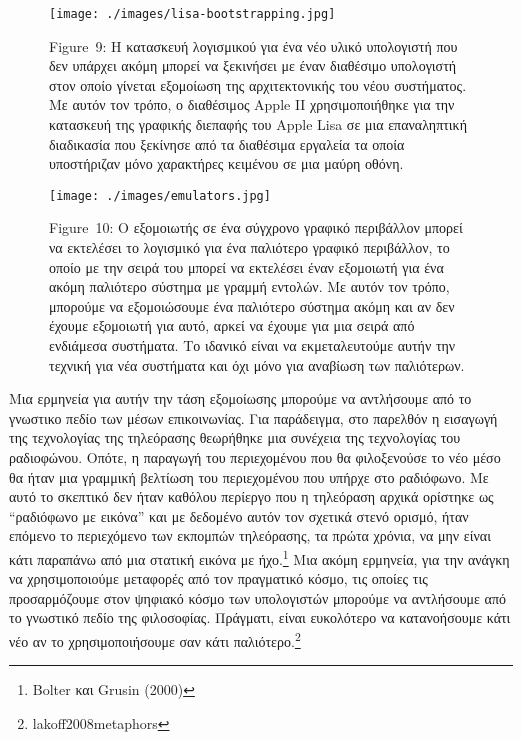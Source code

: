 \documentclass[
]{article}
\begin{document}
\leavevmode{}%
\begin{figure}
\hypertarget{fig:lisa-bootstrapping}{%
\centering
\texttt{[image: ./images/lisa-bootstrapping.jpg]}
\caption{Figure~9: Η κατασκευή λογισμικού για ένα νέο υλικό υπολογιστή
που δεν υπάρχει ακόμη μπορεί να ξεκινήσει με έναν διαθέσιμο υπολογιστή
στον οποίο γίνεται εξομοίωση της αρχιτεκτονικής του νέου συστήματος. Με
αυτόν τον τρόπο, ο διαθέσιμος Apple II χρησιμοποιήθηκε για την κατασκευή
της γραφικής διεπαφής του Apple Lisa σε μια επαναληπτική διαδικασία που
ξεκίνησε από τα διαθέσιμα εργαλεία τα οποία υποστήριζαν μόνο χαρακτήρες
κειμένου σε μια μαύρη οθόνη.}\label{fig:lisa-bootstrapping}
}
\end{figure}

\leavevmode{}%
\begin{figure}
\hypertarget{fig:emulators}{%
\centering
\texttt{[image: ./images/emulators.jpg]}
\caption{Figure~10: Ο εξομοιωτής σε ένα σύγχρονο γραφικό περιβάλλον
μπορεί να εκτελέσει το λογισμικό για ένα παλιότερο γραφικό περιβάλλον,
το οποίο με την σειρά του μπορεί να εκτελέσει έναν εξομοιωτή για ένα
ακόμη παλιότερο σύστημα με γραμμή εντολών. Με αυτόν τον τρόπο, μπορούμε
να εξομοιώσουμε ένα παλιότερο σύστημα ακόμη και αν δεν έχουμε εξομοιωτή
για αυτό, αρκεί να έχουμε για μια σειρά από ενδιάμεσα συστήματα. Το
ιδανικό είναι να εκμεταλευτούμε αυτήν την τεχνική για νέα συστήματα και
όχι μόνο για αναβίωση των παλιότερων.}\label{fig:emulators}
}
\end{figure}

Μια ερμηνεία για αυτήν την τάση εξομοίωσης μπορούμε να αντλήσουμε από το
γνωστικο πεδίο των μέσων επικοινωνίας. Για παράδειγμα, στο παρελθόν η
εισαγωγή της τεχνολογίας της τηλεόρασης θεωρήθηκε μια συνέχεια της
τεχνολογίας του ραδιοφώνου. Οπότε, η παραγωγή του περιεχομένου που θα
φιλοξενούσε το νέο μέσο θα ήταν μια γραμμική βελτίωση του περιεχομένου
που υπήρχε στο ραδιόφωνο. Με αυτό το σκεπτικό δεν ήταν καθόλου περίεργο
που η τηλεόραση αρχικά ορίστηκε ως ``ραδιόφωνο με εικόνα'' και με
δεδομένο αυτόν τον σχετικά στενό ορισμό, ήταν επόμενο το περιεχόμενο των
εκπομπών τηλεόρασης, τα πρώτα χρόνια, να μην είναι κάτι παραπάνω από μια
στατική εικόνα με ήχο.\footnote{Bolter και Grusin (2000)} Μια ακόμη
ερμηνεία, για την ανάγκη να χρησιμοποιούμε μεταφορές από τον πραγματικό
κόσμο, τις οποίες τις προσαρμόζουμε στον ψηφιακό κόσμο των υπολογιστών
μπορούμε να αντλήσουμε από το γνωστικό πεδίο της φιλοσοφίας. Πράγματι,
είναι ευκολότερο να κατανοήσουμε κάτι νέο αν το χρησιμοποιήσουμε σαν
κάτι παλιότερο.\footnote{lakoff2008metaphors}
\end{document}
